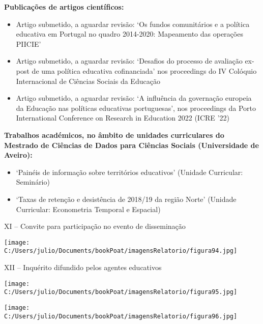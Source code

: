 \documentclass[
]{book}
\begin{document}
\textbf{Publicações de artigos científicos:}

\begin{itemize}
\item
  Artigo submetido, a aguardar revisão: `Os fundos comunitários e a política educativa em Portugal no quadro 2014-2020: Mapeamento das operações PIICIE'
\item
  Artigo submetido, a aguardar revisão: `Desafios do processo de avaliação ex-post de uma política educativa cofinanciada' nos proceedings do IV Colóquio Internacional de Ciências Sociais da Educação
\item
  Artigo submetido, a aguardar revisão: `A influência da governação europeia da Educação nas políticas educativas portuguesas', nos proceedings da Porto International Conference on Research in Education 2022 (ICRE '22)
\end{itemize}

\textbf{Trabalhos académicos, no âmbito de unidades curriculares do Mestrado de Ciências de Dados para Ciências Sociais (Universidade de Aveiro):}

\begin{itemize}
\item
  `Painéis de informação sobre territórios educativos' (Unidade Curricular: Seminário)
\item
  `Taxas de retenção e desistência de 2018/19 da região Norte' (Unidade Curricular: Econometria Temporal e Espacial)
\end{itemize}

XI -- Convite para participação no evento de disseminação

\texttt{[image: C:/Users/julio/Documents/bookPoat/imagensRelatorio/figura94.jpg]}

XII -- Inquérito difundido pelos agentes educativos

\texttt{[image: C:/Users/julio/Documents/bookPoat/imagensRelatorio/figura95.jpg]}

\texttt{[image: C:/Users/julio/Documents/bookPoat/imagensRelatorio/figura96.jpg]}

  
\end{document}
